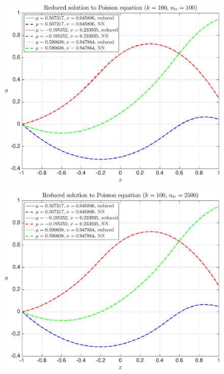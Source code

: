 \documentclass[11pt,a4paper]{article}
\theoremstyle{definition}
\theoremstyle{theorem}
\begin{document}
	\begin{figure}
		\center
		\includegraphics[scale=0.5]{fig31}
		\caption{}
	\end{figure}
	
	\begin{figure}
		\center
		\includegraphics[scale=0.5]{fig32}
		\caption{}
	\end{figure}
	
\end{document}
